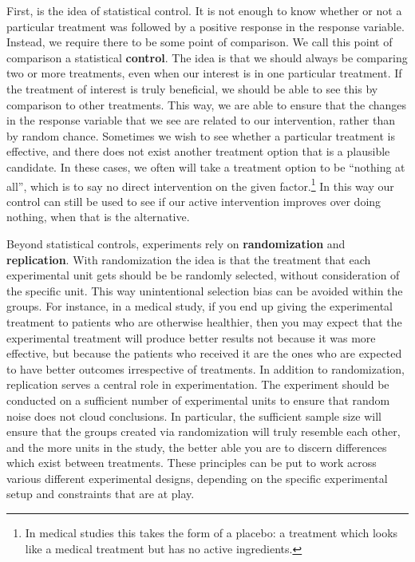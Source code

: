\documentclass[
  letterpaper,
  DIV=11,
  numbers=noendperiod]{scrreprt}
\theoremstyle{definition}
\theoremstyle{definition}
\theoremstyle{definition}
\theoremstyle{remark}
\begin{document}
First, is the idea of statistical control. It is not enough to know
whether or not a particular treatment was followed by a positive
response in the response variable. Instead, we require there to be some
point of comparison. We call this point of comparison a statistical
\textbf{control}. The idea is that we should always be comparing two or
more treatments, even when our interest is in one particular treatment.
If the treatment of interest is truly beneficial, we should be able to
see this by comparison to other treatments. This way, we are able to
ensure that the changes in the response variable that we see are related
to our intervention, rather than by random chance. Sometimes we wish to
see whether a particular treatment is effective, and there does not
exist another treatment option that is a plausible candidate. In these
cases, we often will take a treatment option to be ``nothing at all'',
which is to say no direct intervention on the given factor.\footnote{In
  medical studies this takes the form of a placebo: a treatment which
  looks like a medical treatment but has no active ingredients.} In this
way our control can still be used to see if our active intervention
improves over doing nothing, when that is the alternative.

Beyond statistical controls, experiments rely on \textbf{randomization}
and \textbf{replication}. With randomization the idea is that the
treatment that each experimental unit gets should be be randomly
selected, without consideration of the specific unit. This way
unintentional selection bias can be avoided within the groups. For
instance, in a medical study, if you end up giving the experimental
treatment to patients who are otherwise healthier, then you may expect
that the experimental treatment will produce better results not because
it was more effective, but because the patients who received it are the
ones who are expected to have better outcomes irrespective of
treatments. In addition to randomization, replication serves a central
role in experimentation. The experiment should be conducted on a
sufficient number of experimental units to ensure that random noise does
not cloud conclusions. In particular, the sufficient sample size will
ensure that the groups created via randomization will truly resemble
each other, and the more units in the study, the better able you are to
discern differences which exist between treatments. These principles can
be put to work across various different experimental designs, depending
on the specific experimental setup and constraints that are at play.
\end{document}
